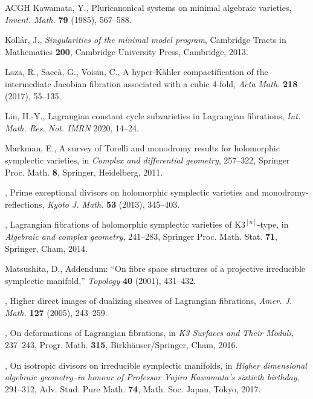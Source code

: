 \documentclass[12pt]{amsart}
\theoremstyle{remark}
\begin{document}
\begin{thebibliography}{ACGH}
 Kawamata, Y., Pluricanonical systems on minimal algebraic varieties, {\it Invent. Math.} {\bf79} (1985), 567--588.


 Koll\'ar, J., {\it Singularities of the minimal model program}, Cambridge Tracts in Mathematics {\bf 200}, Cambridge University Press, Cambridge, 2013.

 Laza, R., Sacc\`a, G., Voisin, C., A hyper-K\"ahler compactification of the intermediate Jacobian fibration associated with a cubic 4-fold, {\em Acta Math.} {\bf218} (2017), 55--135.



 Lin, H.-Y., Lagrangian constant cycle subvarieties in Lagrangian fibrations, {\it Int. Math. Res. Not. IMRN} 2020,   14--24.

 Markman, E., A survey of Torelli and monodromy results for holomorphic symplectic varieties, in \emph{Complex and differential geometry}, 257--322, Springer Proc. Math. {\bf 8}, Springer, Heidelberg, 2011.

 \bysame, Prime exceptional divisors on holomorphic symplectic varieties and monodromy-reflections, {\it Kyoto J. Math.} {\bf 53} (2013), 345--403.

 \bysame, Lagrangian fibrations of holomorphic symplectic varieties of $\mathrm{K3}^{[n]}$-type, in \emph{Algebraic and complex geometry}, 241--283, Springer Proc. Math. Stat. {\bf 71}, Springer, Cham, 2014.



 Matsushita, D., Addendum: ``On fibre space structures of a projective irreducible symplectic manifold,'' {\em Topology} {\bf 40} (2001),  431--432.

 \bysame, Higher direct images of dualizing sheaves of Lagrangian fibrations, {\it Amer. J. Math.} {\bf 127} (2005), 243--259.

 \bysame,  On deformations of Lagrangian fibrations, in {\em K3 Surfaces and Their Moduli,} 237--243, Progr. Math. {\bf315}, Birkh\"auser/Springer, Cham, 2016.

 \bysame, On isotropic divisors on irreducible symplectic manifolds, in \emph{Higher dimensional algebraic geometry--in honour of Professor Yujiro Kawamata's sixtieth birthday}, 291--312,
Adv. Stud. Pure Math. {\bf 74}, Math. Soc. Japan, Tokyo, 2017.


\end{thebibliography}
\end{document}
